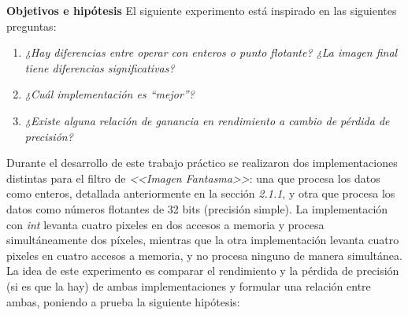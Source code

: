 \documentclass[a4paper]{article}
\begin{document}
\justify
\textbf{Objetivos e hipótesis}
\justify
El siguiente experimento está inspirado en las siguientes preguntas:
\justify
\begin{enumerate}
	\item \textit{¿Hay diferencias entre operar con enteros o punto flotante? ¿La imagen final tiene diferencias significativas?}
	\item \textit{¿Cuál implementación es “mejor”?}
	\item \textit{¿Existe alguna relación de ganancia en rendimiento a cambio de pérdida de precisión?}
\end{enumerate}

\justify
Durante el desarrollo de este trabajo práctico se realizaron dos implementaciones distintas para el filtro de \textit{<<Imagen Fantasma>>}: una que procesa los datos como enteros, detallada anteriormente en la sección \textit{2.1.1}, y otra que procesa los datos como números flotantes de 32 bits (precisión simple). La implementación con \textit{int} levanta cuatro pixeles en dos accesos a memoria y procesa simultáneamente dos píxeles, mientras que la otra implementación levanta cuatro pixeles en cuatro accesos a memoria, y no procesa ninguno de manera simultánea. La idea de este experimento es comparar el rendimiento y la pérdida de precisión (si es que la hay) de ambas implementaciones y formular una relación entre ambas, poniendo a prueba la siguiente hipótesis:
\end{document}
